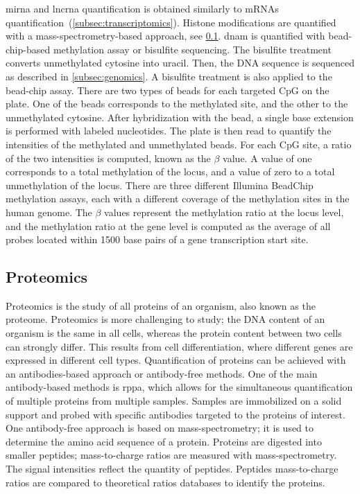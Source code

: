 \documentclass[../main.tex]{subfiles}
\begin{document}
		\gls{mirna} and \gls{lncrna} quantification is obtained similarly to mRNAs quantification~(\cref{subsec:transcriptomics}).
		Histone modifications are quantified with a mass-spectrometry-based approach, see \cref{subsec:proteomics}.
		\Gls{dnam} is quantified with bead-chip-based methylation assay or bisulfite sequencing.
		The bisulfite treatment converts unmethylated cytosine into uracil.
		Then, the DNA sequence is sequenced as described in \cref{subsec:genomics}.
		A bisulfite treatment is also applied to the bead-chip assay.
		There are two types of beads for each targeted CpG on the plate.
		One of the beads corresponds to the methylated site, and the other to the unmethylated cytosine.
		After hybridization with the bead, a single base extension is performed with labeled nucleotides.
		The plate is then read to quantify the intensities of the methylated and unmethylated beads.
		For each CpG site, a ratio of the two intensities is computed, known as the \(\beta\) value.
		A value of one corresponds to a total methylation of the locus, and a value of zero to a total unmethylation of the locus.
		There are three different Illumina BeadChip methylation assays, each with a different coverage of the methylation sites in the human genome.
		The \(\beta\) values represent the methylation ratio at the locus level, and the methylation ratio at the gene level is computed as the average of all probes located within 1500 base pairs of a gene transcription start site.

	\subsection{Proteomics}\label{subsec:proteomics}
		Proteomics is the study of all proteins of an organism, also known as the proteome.
		Proteomics is more challenging to study; the DNA content of an organism is the same in all cells, whereas the protein content between two cells can strongly differ.
		This results from cell differentiation, where different genes are expressed in different cell types.
		Quantification of proteins can be achieved with an antibodies-based approach or antibody-free methods.
		One of the main antibody-based methods is \gls{rppa}, which allows for the simultaneous quantification of multiple proteins from multiple samples.
		Samples are immobilized on a solid support and probed with specific antibodies targeted to the proteins of interest.
		One antibody-free approach is based on mass-spectrometry; it is used to determine the amino acid sequence of a protein.
		Proteins are digested into smaller peptides; mass-to-charge ratios are measured with mass-spectrometry.
		The signal intensities reflect the quantity of peptides.
		Peptides mass-to-charge ratios are compared to theoretical ratios databases to identify the proteins.
\end{document}
